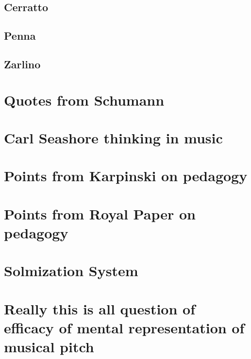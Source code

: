 \documentclass[]{book}
\theoremstyle{definition}
\theoremstyle{definition}
\theoremstyle{definition}
\theoremstyle{remark}
\begin{document}
\hypertarget{cerratto}{%
\subsection{Cerratto}\label{cerratto}}

\hypertarget{penna}{%
\subsection{Penna}\label{penna}}

\hypertarget{zarlino}{%
\subsection{Zarlino}\label{zarlino}}

\hypertarget{quotes-from-schumann}{%
\section{Quotes from Schumann}\label{quotes-from-schumann}}

\hypertarget{carl-seashore-thinking-in-music}{%
\section{Carl Seashore thinking in
music}\label{carl-seashore-thinking-in-music}}

\hypertarget{points-from-karpinski-on-pedagogy}{%
\section{Points from Karpinski on
pedagogy}\label{points-from-karpinski-on-pedagogy}}

\hypertarget{points-from-royal-paper-on-pedagogy}{%
\section{Points from Royal Paper on
pedagogy}\label{points-from-royal-paper-on-pedagogy}}

\hypertarget{solmization-system}{%
\section{Solmization System}\label{solmization-system}}

\hypertarget{really-this-is-all-question-of-efficacy-of-mental-representation-of-musical-pitch}{%
\section{Really this is all question of efficacy of mental
representation of musical
pitch}\label{really-this-is-all-question-of-efficacy-of-mental-representation-of-musical-pitch}}
\end{document}
